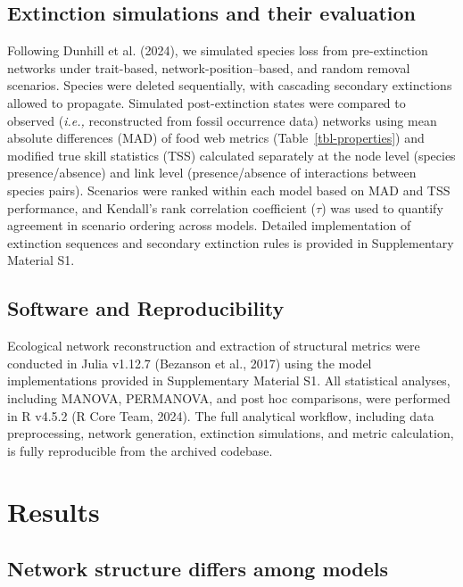 \documentclass[
]{article}
\begin{document}
\subsection{Extinction simulations and their
evaluation}\label{extinction-simulations-and-their-evaluation}

Following Dunhill et al. (2024), we simulated species loss from
pre-extinction networks under trait-based, network-position--based, and
random removal scenarios. Species were deleted sequentially, with
cascading secondary extinctions allowed to propagate. Simulated
post-extinction states were compared to observed (\emph{i.e.,}
reconstructed from fossil occurrence data) networks using mean absolute
differences (MAD) of food web metrics (Table~\ref{tbl-properties}) and
modified true skill statistics (TSS) calculated separately at the node
level (species presence/absence) and link level (presence/absence of
interactions between species pairs). Scenarios were ranked within each
model based on MAD and TSS performance, and Kendall's rank correlation
coefficient (\(\tau\)) was used to quantify agreement in scenario
ordering across models. Detailed implementation of extinction sequences
and secondary extinction rules is provided in Supplementary Material S1.

\subsection{Software and
Reproducibility}\label{software-and-reproducibility}

Ecological network reconstruction and extraction of structural metrics
were conducted in Julia v1.12.7 (Bezanson et al., 2017) using the model
implementations provided in Supplementary Material S1. All statistical
analyses, including MANOVA, PERMANOVA, and post hoc comparisons, were
performed in R v4.5.2 (R Core Team, 2024). The full analytical workflow,
including data preprocessing, network generation, extinction
simulations, and metric calculation, is fully reproducible from the
archived codebase.

\section{Results}\label{results}

\subsection{Network structure differs among
models}\label{network-structure-differs-among-models}
\end{document}
